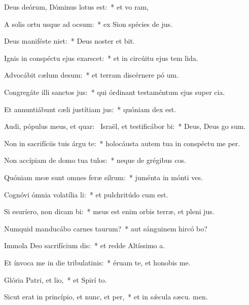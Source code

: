 \item Deus deórum, Dóminus lotus est:~* et vo ram,
\item A solis ortu usque ad ocsum:~* ex Sion spécies de jus.
\item Deus maniféste niet:~* Deus noster et  bit.
\item Ignis in conspéctu ejus exarscet:~* et in circúitu ejus tem lida.
\item Advocábit cælum desum:~* et terram discérnere pó um.
\item Congregáte illi sanctos jus:~* qui órdinant testaméntum ejus super cia.
\item Et annuntiábunt cæli justítiam jus:~* quóniam  dex est.
\item Audi, pópulus meus, et quar:~\pscross{} Israël, et testificábor bi:~* Deus, Deus  go sum.
\item Non in sacrifíciis tuis árgu te:~* holocáusta autem tua in conspéctu me  per.
\item Non accípiam de domo tua tulos:~* neque de grégibus  cos.
\item Quóniam meæ sunt omnes feræ silrum:~* juménta in mónti  ves.
\item Cognóvi ómnia volatília li:~* et pulchritúdo  cum est.
\item Si esuríero, non dicam bi:~* meus est enim orbis terræ, et pleni jus.
\item Numquid manducábo carnes taurum?~* aut sánguinem hircó bo?
\item Immola Deo sacrifícium dis:~* et redde Altíssimo  a.
\item Et ínvoca me in die tribulatinis:~* éruam te, et honobis me.
\item Glória Patri, et lio,~* et Spirí to.
\item Sicut erat in princípio, et nunc, et per,~* et in sǽcula sæcu. men.
